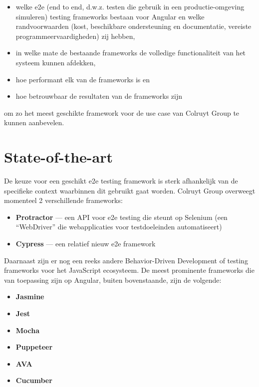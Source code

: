 \begin{itemize}
    \item welke e2e (end to end, d.w.z. testen die gebruik in een productie-omgeving simuleren) testing frameworks bestaan voor Angular en welke randvoorwaarden (kost, beschikbare ondersteuning en documentatie, vereiste programmeervaardigheden) zij hebben,
    \item in welke mate de bestaande frameworks de volledige functionaliteit van het systeem kunnen afdekken,
    \item hoe performant elk van de frameworks is en
    \item hoe betrouwbaar de resultaten van de frameworks zijn
\end{itemize}

om zo het meest geschikte framework voor de use case van Colruyt Group te kunnen aanbevelen.


\section{State-of-the-art}
\label{sec:state-of-the-art}

De keuze voor een geschikt e2e testing framework is sterk afhankelijk van de specifieke context waarbinnen dit gebruikt gaat worden. Colruyt Group overweegt momenteel 2 verschillende frameworks:

\begin{itemize}
    \item \textbf{Protractor} — een API voor e2e testing die steunt op Selenium (een ``WebDriver'' die webapplicaties voor testdoeleinden automatiseert)
    \item \textbf{Cypress} — een relatief nieuw e2e framework
\end{itemize}

\vspace{\baselineskip}

Daarnaast zijn er nog een reeks andere Behavior-Driven Development of testing frameworks voor het JavaScript ecosysteem. De meest prominente frameworks die van toepassing zijn op Angular, buiten bovenstaande, zijn de volgende:

\begin{itemize}
    \item \textbf{Jasmine}
    \item \textbf{Jest}
    \item \textbf{Mocha}
    \item \textbf{Puppeteer}
    \item \textbf{AVA}
    \item \textbf{Cucumber}
\end{itemize}

